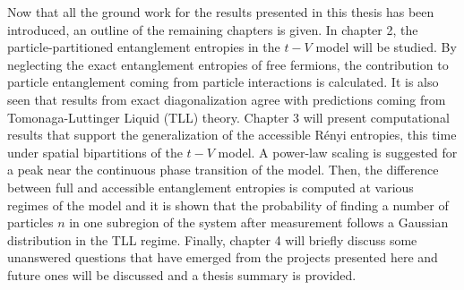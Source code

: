 Now that all the ground work for the results presented in this thesis has been introduced, an outline of the remaining chapters is given. In chapter 2, the particle-partitioned entanglement entropies in the $t-V$ model will be studied. By neglecting the exact entanglement entropies of free fermions, the contribution to particle entanglement coming from particle interactions is calculated. It is also seen that results from exact diagonalization agree with predictions coming from Tomonaga-Luttinger Liquid (TLL) theory. Chapter 3 will present computational results that support the generalization of the accessible R\'enyi entropies, this time under spatial bipartitions of the $t-V$ model. A power-law scaling is suggested for a peak near the continuous phase transition of the model. Then, the difference between full and accessible entanglement entropies is computed at various regimes of the model and it is shown that the probability of finding a number of particles $n$ in one subregion of the system after measurement follows a Gaussian distribution in the TLL regime. Finally, chapter 4 will briefly discuss some unanswered questions that have emerged from the projects presented here and future ones will be discussed and a thesis summary is provided.




	

	
